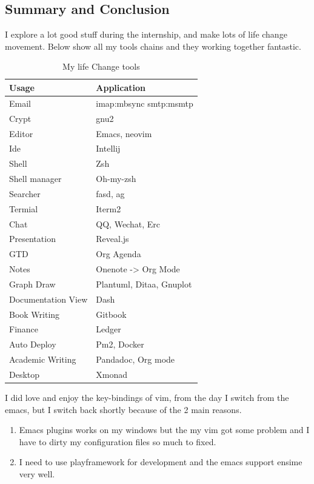 \documentclass[12pt]{scrartcl}
\begin{document}
\subsection{Summary and Conclusion}
\label{sec:org2bd2122}
I explore a lot good stuff during the internship, and make lots of life change
movement. Below show all my tools chains and they working together fantastic.
\begin{table}[htbp]
\caption{\label{tab:orgcbf30eb}
My life Change tools}
\centering
\begin{tabular}{ll}
Usage & Application\\
\hline
Email & imap:mbsync smtp:msmtp\\
Crypt & gnu2\\
Editor & Emacs, neovim\\
Ide & Intellij\\
Shell & Zsh\\
Shell manager & Oh-my-zsh\\
Searcher & fasd, ag\\
Termial & Iterm2\\
Chat & QQ, Wechat, Erc\\
Presentation & Reveal.js\\
GTD & Org Agenda\\
Notes & Onenote -> Org Mode\\
Graph Draw & Plantuml, Ditaa, Gnuplot\\
Documentation View & Dash\\
Book Writing & Gitbook\\
Finance & Ledger\\
Auto Deploy & Pm2, Docker\\
Academic Writing & Pandadoc, Org mode\\
Desktop & Xmonad\\
\end{tabular}
\end{table}

I did love and enjoy the key-bindings of vim, from the day I switch from the emacs, but I switch back shortly because of the 2 main reasons.
\begin{enumerate}
\item Emacs plugins works on my windows but the my vim got some problem and I have to dirty my configuration files so much to fixed.
\item I need to use playframework for development and the emacs support ensime very well.
\end{enumerate}
\end{document}
